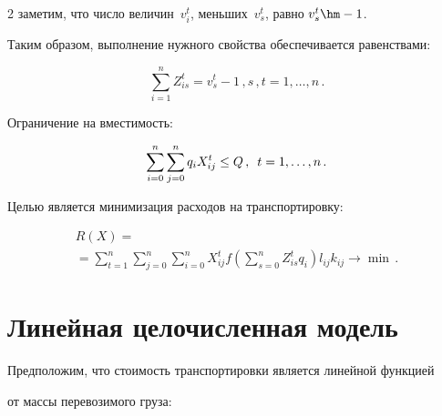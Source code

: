 \begin{multicols}{2}
заметим, что число величин~$v_i^t$, меньших~$v_s^t$, равно $v_s^t\hm-1$.


Таким образом, выполнение нужного свойства обеспечивается равенствами:


  \begin{equation}


  \sum\limits_{i=1}^n Z_{is}^t =v_s^t -1\,, s\,,t=1,\ldots, n\,.


  \label{e7-br}


  \end{equation}





     Ограничение на вместимость:


     \begin{equation}


     \sum\limits_{i=0}^n \sum\limits_{j=0}^n q_i X_{ij}^t \leq Q\,,\enskip


t=1,\ldots, n\,.


     \label{e8-br}


     \end{equation}





  Целью является минимизация расходов на транспортировку:


  \begin{multline}


  R(X) = {}\\


  {}=\sum\limits_{t=1}^n \sum\limits_{j=0}^n \sum\limits_{i=0}^n X_{ij}^t f


\left ( \sum\limits_{s=0}^n Z^t_{is} q_i\right) l_{ij} k_{ij} \to \min\,.


  \label{e9-br}


  \end{multline}





\section{Линейная целочисленная модель}





  Предположим, что стоимость транспортировки является линейной функцией


от массы перевозимого груза:


$$



\end{multicols}

